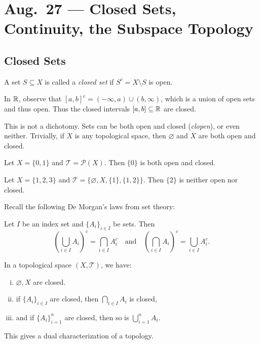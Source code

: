 \chapter{Aug.~27 --- Closed Sets, Continuity, the Subspace Topology}

\section{Closed Sets}
\begin{definition}
  A set $S \subseteq X$ is called a \emph{closed set}
  if $S^c = X \setminus S$ is open.
\end{definition}

\begin{example}
  In $\mathbb{R}$, observe that
  $[a, b]^c = (-\infty, a) \cup (b, \infty)$,
  which is a union of open sets and thus open.
  Thus the closed intervals $[a, b] \subseteq \mathbb{R}$ are closed.
\end{example}

\begin{remark}
  This is not a dichotomy. Sets can be
  both open and closed (\emph{clopen}), or even neither.
  Trivially, if $X$ is any topological space,
  then $\varnothing$ and $X$ are both open and closed.
\end{remark}

\begin{example}
  Let $X = \{0, 1\}$ and $\mathcal{T} = \mathcal{P}(X)$.
  Then $\{0\}$ is both open and closed.
\end{example}

\begin{example}
  Let $X = \{1, 2, 3\}$ and
  $\mathcal{T} = \{\varnothing, X, \{1\}, \{1, 2\}\}$.
  Then $\{2\}$ is neither open nor closed.
\end{example}

Recall the following De Morgan's laws from set theory:
\begin{prop}
  Let $I$ be an index set and $\{A_i\}_{i \in I}$
  be sets. Then
  \[\left( \bigcup_{i \in I} A_i \right)^c = \bigcap_{i \in I} A_i^c
    \quad \text{and} \quad
    \left( \bigcap_{i \in I} A_i \right)^c = \bigcup_{i \in I} A_i^c.
  \]
\end{prop}

\begin{corollary}
  In a topological space $(X, \mathcal{T})$, we have:
  \begin{enumerate}[(i)]
    \item $\varnothing, X$ are closed.
    \item if $\{A_i\}_{i \in I}$ are closed,
      then $\bigcap_{i \in I} A_i$ is closed,
    \item and if $\{A_i\}_{i = 1}^n$ are closed,
      then so is $\bigcup_{i = 1}^n A_i$.
  \end{enumerate}
  This gives a dual characterization of a topology.
\end{corollary}

